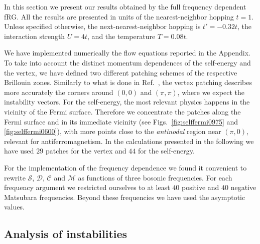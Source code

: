 In this section we present our results obtained by the full frequency dependent fRG. All the results are presented in units of the nearest-neighbor hopping \mbox{$t=1$}. Unless specified otherwise, the next-nearest-neighbor hopping is $t'=-0.32t$, the interaction strength $U=4t$, and the temperature $T=0.08t$.

We have implemented numerically the flow equations reported in the Appendix. 
To take into account the distinct momentum dependences of the self-energy and the vertex, we have defined two different patching schemes of the respective Brillouin zones. 
Similarly to what is done in Ref.~, the vertex patching describes more accurately the corners around $(0,0)$ and $(\pi,\pi)$, where we expect the instability vectors.
For the self-energy, the most relevant physics happens in the vicinity of the Fermi surface.
Therefore we concentrate the patches along the Fermi surface and in its immediate vicinity (see Figs.~\ref{fig:selffermi0975} and \ref{fig:selffermi0600}), with more points close to the \textit{antinodal} region near $(\pi,0)$, relevant for antiferromagnetism.
In the calculations presented in the following we have used $29$ patches for the vertex and $44$ for the self-energy.

For the implementation of the frequency dependence we found it convenient to rewrite $\mathcal{S}$, $\mathcal{D}$, $\mathcal{C}$ and $\mathcal{M}$ as functions of three bosonic frequencies. 
For each frequency argument we restricted ourselves to at least $40$ positive and $40$ negative Matsubara frequencies. Beyond these frequencies we have used the asymptotic values. 

\subsection{Analysis of instabilities}

